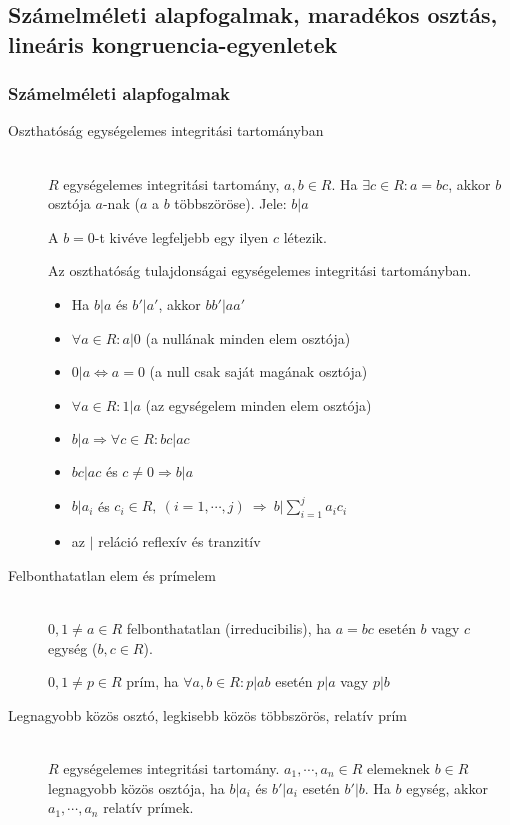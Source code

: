 \documentclass[margin=0px]{article}
\begin{document}
\subsection{Számelméleti alapfogalmak, maradékos osztás, lineáris kongruencia-egyenletek}
\subsubsection{Számelméleti alapfogalmak}
\begin{description}
    \item[Oszthatóság egységelemes integritási tartományban] \hfill \\
        $R$ egységelemes integritási tartomány, $a,b\in R$. Ha $\exists c\in R: a = bc$, akkor $b$ osztója  $a$-nak ($a$ a $b$ többszöröse). Jele: $b|a$

        A $b = 0$-t kivéve legfeljebb egy ilyen $c$ létezik.

        Az oszthatóság tulajdonságai egységelemes integritási tartományban.
        \begin{itemize}
            \item Ha $b|a$ és $b'|a'$, akkor $bb'|aa'$
            \item $\forall a\in R: a|0$ (a nullának minden elem osztója)
            \item $0|a \Leftrightarrow a = 0$ (a null csak saját magának osztója)
            \item $\forall a\in R: 1|a$ (az egységelem minden elem osztója)
            \item $b|a \Rightarrow \forall c \in R : bc|ac$
            \item $bc|ac$ és $c\neq0 \Rightarrow b|a$
            \item $b|a_i$ és $c_i \in R,\ (i = 1,\cdots,j) \ \Rightarrow \ b|\sum_{i=1}^{j}a_ic_i$
            \item az $|$ reláció reflexív és tranzitív
        \end{itemize}
    \item[Felbonthatatlan elem és prímelem] \hfill \\
        $0,1 \neq a \in R$ felbonthatatlan (irreducibilis), ha $a = bc$ esetén $b$ vagy $c$ egység ($b,c \in R$).

        $0,1 \neq p \in R$ prím, ha $\forall a,b \in R : p|ab$ esetén $p|a$ vagy $p|b$
    \item[Legnagyobb közös osztó, legkisebb közös többszörös, relatív prím] \hfill \\
        $R$ egységelemes integritási tartomány. $a_1,\cdots,a_n \in R$ elemeknek $b\in R$ legnagyobb közös osztója, ha $b|a_i$ és $b'|a_i$ esetén $b'|b$. Ha $b$ egység, akkor $a_1, \cdots , a_n$ relatív prímek.


\end{description}
\end{document}
